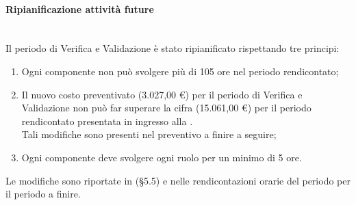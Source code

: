 \paragraph{Ripianificazione attività future} \mbox{}\\
Il periodo di Verifica e Validazione è stato ripianificato rispettando tre principi:
\begin{enumerate}
\item Ogni componente non può svolgere più di 105 ore nel periodo rendicontato;
\item Il nuovo costo preventivato (3.027,00 \euro) per il periodo di Verifica e Validazione non può far superare la cifra (15.061,00 \euro) per il periodo rendicontato presentata in ingresso alla \RR{}. \\Tali modifiche sono presenti nel preventivo a finire a seguire;
\item Ogni componente deve svolgere ogni ruolo per un minimo di 5 ore.
\end{enumerate}

Le modifiche sono riportate in  (§5.5) e nelle rendicontazioni orarie del periodo per il periodo a finire.
